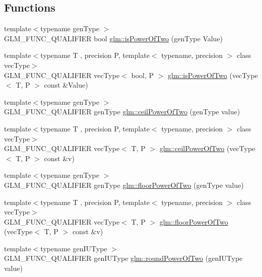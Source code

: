 \subsection*{Functions}
\begin{DoxyCompactItemize}
\item 
{\footnotesize template$<$typename gen\+Type $>$ }\\G\+L\+M\+\_\+\+F\+U\+N\+C\+\_\+\+Q\+U\+A\+L\+I\+F\+I\+E\+R bool \hyperlink{namespaceglm_a2e60d24d864637d3ebd62e6fa4941613}{glm\+::is\+Power\+Of\+Two} (gen\+Type Value)
\item 
{\footnotesize template$<$typename T , precision P, template$<$ typename, precision $>$ class vec\+Type$>$ }\\G\+L\+M\+\_\+\+F\+U\+N\+C\+\_\+\+Q\+U\+A\+L\+I\+F\+I\+E\+R vec\+Type$<$ bool, P $>$ \hyperlink{group__gtc__round_gad454e4c8d8cd73ddc7de855f733a1465}{glm\+::is\+Power\+Of\+Two} (vec\+Type$<$ T, P $>$ const \&Value)
\item 
{\footnotesize template$<$typename gen\+Type $>$ }\\G\+L\+M\+\_\+\+F\+U\+N\+C\+\_\+\+Q\+U\+A\+L\+I\+F\+I\+E\+R gen\+Type \hyperlink{namespaceglm_a15ad0f1b70561471f34bc2e43469424e}{glm\+::ceil\+Power\+Of\+Two} (gen\+Type value)
\item 
{\footnotesize template$<$typename T , precision P, template$<$ typename, precision $>$ class vec\+Type$>$ }\\G\+L\+M\+\_\+\+F\+U\+N\+C\+\_\+\+Q\+U\+A\+L\+I\+F\+I\+E\+R vec\+Type$<$ T, P $>$ \hyperlink{group__gtc__round_ga76ec9b214ea1376fe09a903e34bab847}{glm\+::ceil\+Power\+Of\+Two} (vec\+Type$<$ T, P $>$ const \&v)
\item 
{\footnotesize template$<$typename gen\+Type $>$ }\\G\+L\+M\+\_\+\+F\+U\+N\+C\+\_\+\+Q\+U\+A\+L\+I\+F\+I\+E\+R gen\+Type \hyperlink{namespaceglm_ac1385510b859757901e927c43bf4f329}{glm\+::floor\+Power\+Of\+Two} (gen\+Type value)
\item 
{\footnotesize template$<$typename T , precision P, template$<$ typename, precision $>$ class vec\+Type$>$ }\\G\+L\+M\+\_\+\+F\+U\+N\+C\+\_\+\+Q\+U\+A\+L\+I\+F\+I\+E\+R vec\+Type$<$ T, P $>$ \hyperlink{group__gtc__round_ga6a5a8f6dd1b2f755e4572bd039062c37}{glm\+::floor\+Power\+Of\+Two} (vec\+Type$<$ T, P $>$ const \&v)
\item 
{\footnotesize template$<$typename gen\+I\+U\+Type $>$ }\\G\+L\+M\+\_\+\+F\+U\+N\+C\+\_\+\+Q\+U\+A\+L\+I\+F\+I\+E\+R gen\+I\+U\+Type \hyperlink{group__gtc__round_ga6d24a9e3abe3e6a908661b43acb8efe0}{glm\+::round\+Power\+Of\+Two} (gen\+I\+U\+Type value)

\end{DoxyCompactItemize}
